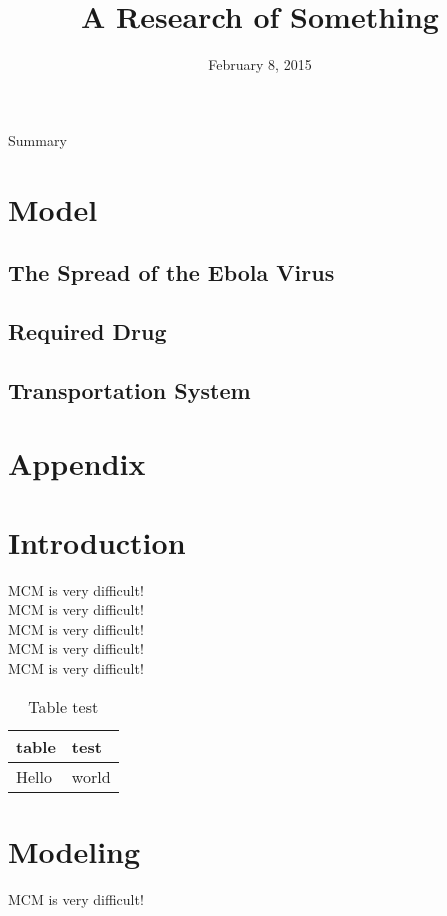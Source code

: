 \documentclass{icmmcm}
\title{A Research of Something}
\date{February 8, 2015}
\begin{document}
\begin{summary}
Summary
\end{summary}

\section{Model}
\subsection{The Spread of the Ebola Virus}

\subsection{Required Drug}

\subsection{Transportation System}


\section{Appendix}


\maketitle
\thispagestyle{fancy}
\tableofcontents


\section{Introduction}
MCM is very difficult!\\
MCM is very difficult!\\
MCM is very difficult!\\
MCM is very difficult!\\
MCM is very difficult!
\begin{table}
\centering
\begin{tabular}{|l|l|}
\hline
table & test\\
\hline
Hello & world\\
\hline
\end{tabular}
\caption{Table test}
\label{tab:1}
\end{table}
\newpage
\section{Modeling}
MCM is very difficult!
\end{document}
